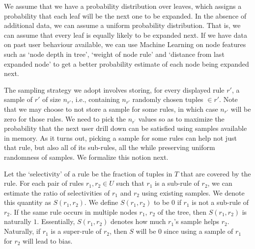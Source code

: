 We assume that we have a probability distribution over leaves, which assigns a probability that each leaf will be the next one to be expanded. In the absence of additional data, we can assume a uniform probability distribution. That is, we can assume that every leaf is equally likely to be expanded next. If we have data on past user behaviour available, we can use Machine Learning on node features such as `node depth in tree', `weight of node rule' and `distance from last expanded node' to get a better probability estimate of each node being expanded next. 



 The sampling strategy we adopt involves storing, 
for every displayed rule $r'$, a sample of $r'$ of size $n_{r'}$, i.e., 
containing $n_{r'}$ randomly chosen tuples $\in r'$.
Note that we may choose to not store a sample for some rules, in which case $n_{r'}$
will be zero for those rules. 
We need to pick the $n_{r^{\prime}}$ values so as to maximize the probability that the next user drill down can be satisfied using samples available in memory. 
As it turns out, picking a sample for some rules can help not just that rule, but
also all of its sub-rules, all the while preserving uniform randomness of samples. We formalize this notion next.


Let the `selectivity' of a rule be the fraction of tuples in $T$ that are covered by the rule. 
For each pair of rules $r_1, r_2 \in U$ such that $r_1$ is a sub-rule of $r_2$, we can estimate the ratio of selectivities of $r_1$ and $r_2$ using existing samples. We denote this quantity as $S(r_1, r_2)$. 
We define $S(r_1, r_2)$ to be $0$ if $r_1$ is not a sub-rule of $r_2$. 
If the same rule occurs in multiple nodes $r_1$, $r_2$ of the tree, then $S(r_1, r_2)$ is naturally $1$. 
Essentially, $S(r_1, r_2)$ denotes how much $r_1$'s sample helps $r_2$. 
Naturally, if $r_1$ is a super-rule of $r_2$, then $S$ will be $0$ since using a sample of $r_1$
for $r_2$ will lead to bias.

